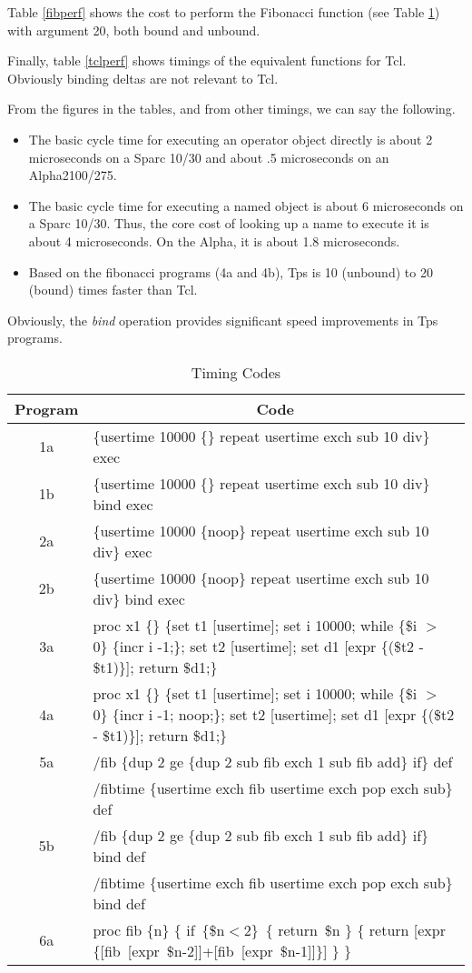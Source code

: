 Table \ref{fibperf} shows the cost to perform the Fibonacci
function (see Table \ref{pfcode1})
with argument 20, both bound and unbound.

Finally, table \ref{tclperf} shows timings of the equivalent
functions for Tcl.  Obviously binding deltas are not relevant to Tcl.

From the figures in the tables, and from  other timings,
we can say the following.
\begin{itemize}
\item The basic cycle time for executing an operator object
directly is about 2 microseconds on a Sparc 10/30
and about .5 microseconds on an Alpha2100/275.
\item The basic cycle time for executing a named object
is about 6 microseconds on a Sparc 10/30.
Thus, the core cost of looking up
a name to execute it is about 4 microseconds.
On the Alpha, it is about 1.8 microseconds.
\item Based on the fibonacci programs (4a and 4b),
Tps is 10 (unbound) to 20 (bound) times faster than Tcl.
\end{itemize}
Obviously, the {\em bind} operation provides significant speed
improvements in Tps programs.
\begin{table}[b]\centering
\begin{tabular}{|c|p{5in}|}
\hline
\multicolumn{1}{|c}{Program} & \multicolumn{1}{|c|}{Code} \\ \hline
1a & \{usertime 10000 \{\} repeat usertime exch sub 10 div\} exec \\ \hline
1b & \{usertime 10000 \{\} repeat usertime exch sub 10 div\} bind exec \\ \hline
2a & \{usertime 10000 \{noop\} repeat usertime exch sub 10 div\} exec \\ \hline
2b & \{usertime 10000 \{noop\} repeat usertime exch sub 10 div\} bind exec \\ \hline
3a & proc x1 \{\} \{set t1 [usertime]; set i 10000; while \{\$i $>$ 0\} \{incr i -1;\}; set t2 [usertime]; set d1 [expr \{(\$t2 - \$t1)\}]; return \$d1;\} \\ \hline
4a & proc x1 \{\} \{set t1 [usertime]; set i 10000; while \{\$i $>$ 0\} \{incr i -1; noop;\}; set t2 [usertime]; set d1 [expr \{(\$t2 - \$t1)\}]; return \$d1;\} \\ \hline
5a & 
/fib $\{$dup 2 ge $\{$dup 2 sub fib exch 1 sub fib add$\}$ if$\}$ def \\
& /fibtime $\{$usertime exch fib usertime exch pop exch sub$\}$ def \\ \hline
5b & 
/fib $\{$dup 2 ge $\{$dup 2 sub fib exch 1 sub fib add$\}$ if$\}$ bind def \\
& /fibtime $\{$usertime exch fib usertime exch pop exch sub$\}$ bind def \\ \hline
6a &
proc fib $\{$n$\}$ $\{$
   if\ $\{$\$n$<$2$\}$\ $\{$
      return\ \$n
   $\}$ $\{$
      return [expr\ $\{$[fib\ [expr\ \$n-2]]+[fib\ [expr\ \$n-1]]$\}$]
     $\}$
$\}$ \\ \hline
\end{tabular}
\caption{Timing Codes}
\label{pfcode1}
\end{table}

